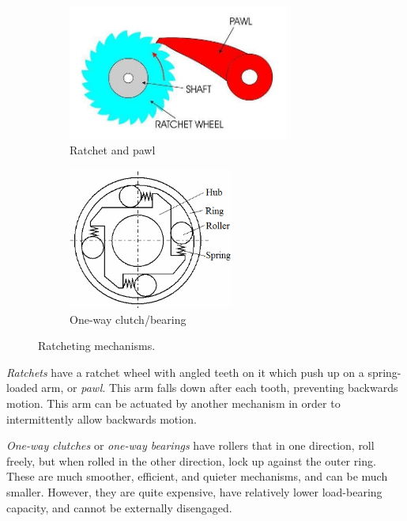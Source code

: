 \begin{figure}[H]
	\begin{subfigure}[b]{.4\linewidth}
		\includegraphics[width=0.8\textwidth]{imgs/ratchet.jpeg}
		\caption{Ratchet and pawl}
	\end{subfigure}\begin{subfigure}[b]{.4\linewidth}
		\includegraphics[width=0.6\textwidth]{imgs/oneway_clutch.png}
		\caption{One-way clutch/bearing}
	\end{subfigure}
	\caption{Ratcheting mechanisms.}
\end{figure}

\begin{asparaenum}[a)]
	\item \textit{Ratchets} have a ratchet wheel with angled teeth on it which push up on a spring-loaded arm, or \textit{pawl}. This arm falls down after each tooth, preventing backwards motion. This arm can be actuated by another mechanism in order to intermittently allow backwards motion.
	\item \textit{One-way clutches} or \textit{one-way bearings} have rollers that in one direction, roll freely, but when rolled in the other direction, lock up against the outer ring. These are much smoother, efficient, and quieter mechanisms, and can be much smaller. However, they are quite expensive, have relatively lower load-bearing capacity, and cannot be externally disengaged.
\end{asparaenum}


